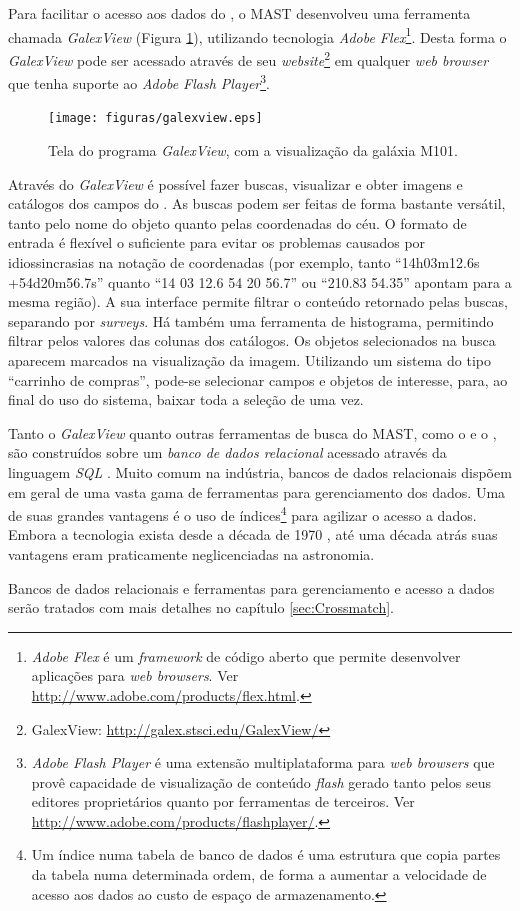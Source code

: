 Para facilitar o acesso aos dados do \galex, o MAST desenvolveu uma ferramenta
chamada {\em GalexView} (Figura \ref{fig:GalexView}), utilizando tecnologia {\em
Adobe Flex}\footnote{{\em Adobe Flex} é um {\em framework} de código aberto que
permite desenvolver aplicações para {\em web browsers}. Ver
\url{http://www.adobe.com/products/flex.html}.}. Desta forma o {\em GalexView }
pode ser acessado através de seu {\em website}\footnote{GalexView:
\url{http://galex.stsci.edu/GalexView/}} em qualquer {\em web browser} que tenha
suporte ao {\em Adobe Flash Player}\footnote{{\em Adobe Flash Player} é uma
extensão multiplataforma para {\em web browsers} que provê capacidade de
visualização de conteúdo {\em flash} gerado tanto pelos seus editores
proprietários quanto por ferramentas de terceiros. Ver
\url{http://www.adobe.com/products/flashplayer/}.}.

\begin{figure}
	\texttt{[image: figuras/galexview.eps]}
	\caption[Tela do programa{\em GalexView}.]
	{Tela do programa {\em GalexView}, com a visualização da galáxia M101.}
	\label{fig:GalexView}
\end{figure}

Através do {\em GalexView} é possível fazer buscas, visualizar e obter imagens e
catálogos dos campos do \galex. As buscas podem ser feitas de forma bastante
versátil, tanto pelo nome do objeto quanto pelas coordenadas do céu. O formato
de entrada é flexível o suficiente para evitar os problemas causados por
idiossincrasias na notação de coordenadas (por exemplo, tanto ``14h03m12.6s
+54d20m56.7s'' quanto ``14 03 12.6 54 20 56.7'' ou ``210.83 54.35'' apontam para
a mesma região). A sua interface permite filtrar o conteúdo retornado pelas
buscas, separando por {\em surveys}. Há também uma ferramenta de histograma,
permitindo filtrar pelos valores das colunas dos catálogos. Os objetos
selecionados na busca aparecem marcados na visualização da imagem. Utilizando um
sistema do tipo ``carrinho de compras'', pode-se selecionar campos e objetos de
interesse, para, ao final do uso do sistema, baixar toda a seleção de uma vez.

Tanto o {\em GalexView} quanto outras ferramentas de busca do MAST, como o
 e o , são construídos sobre um
{\em banco de dados relacional} acessado através da linguagem {\em SQL}
\citep{Chamberlin1974}. Muito comum na indústria, bancos de dados relacionais
dispõem em geral de uma vasta gama de ferramentas para gerenciamento dos dados.
Uma de suas grandes vantagens é o uso de índices\footnote{Um índice numa tabela
de banco de dados é uma estrutura que copia partes da tabela numa determinada
ordem, de forma a aumentar a velocidade de acesso aos dados ao custo de espaço
de armazenamento.} para agilizar o acesso a dados. Embora a tecnologia exista
desde a década de 1970 \citep{Codd1970}, até uma década atrás suas vantagens
eram praticamente neglicenciadas na astronomia.

Bancos de dados relacionais e ferramentas para gerenciamento e acesso a dados
serão tratados com mais detalhes no capítulo \ref{sec:Crossmatch}.


